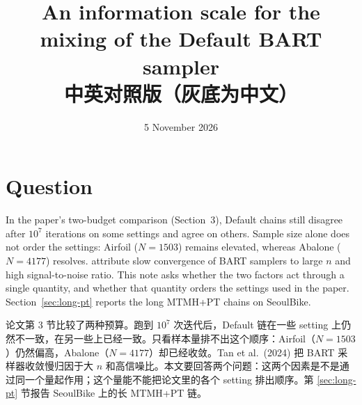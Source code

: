\documentclass[11pt]{article}
\title{An information scale for the mixing of the Default BART sampler\\[0.3em]\large 中英对照版（灰底为中文）}
\author{}
\date{5 November 2026}
\newcommand{\zhfont}{}
\begin{document}
\maketitle
\vspace{-1.5em}
\section{Question\quad{\zhfont 问题}}
In the paper's two-budget comparison (Section~3), Default chains still disagree after $10^7$ iterations on some settings and agree on others. Sample size alone does not order the settings: Airfoil ($N=1503$) remains elevated, whereas Abalone ($N=4177$) resolves. \citet{tan2024computational} attribute slow convergence of BART samplers to large $n$ and high signal-to-noise ratio. This note asks whether the two factors act through a single quantity, and whether that quantity orders the settings used in the paper. Section~\ref{sec:long-pt} reports the long MTMH+PT chains on SeoulBike.

\begin{zhbox}
论文第 3 节比较了两种预算。跑到 $10^7$ 次迭代后，Default 链在一些 setting 上仍然不一致，在另一些上已经一致。只看样本量排不出这个顺序：Airfoil（$N=1503$）仍然偏高，Abalone（$N=4177$）却已经收敛。Tan et al.\ (2024) 把 BART 采样器收敛慢归因于大 $n$ 和高信噪比。本文要回答两个问题：这两个因素是不是通过同一个量起作用；这个量能不能把论文里的各个 setting 排出顺序。第 \ref{sec:long-pt} 节报告 SeoulBike 上的长 MTMH+PT 链。
\end{zhbox}
\end{document}
